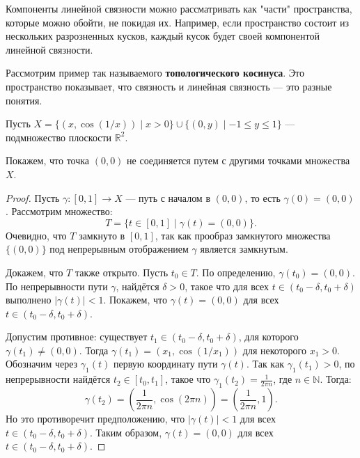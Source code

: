 Компоненты линейной связности можно рассматривать как "части" пространства, которые можно обойти, не покидая их. Например, если пространство состоит из нескольких разрозненных кусков, каждый кусок будет своей компонентой линейной связности.



Рассмотрим пример так называемого \textbf{топологического косинуса}. Это пространство показывает, что связность и линейная связность — это разные понятия.

\begin{example}
Пусть $ X = \{ (x, \cos(1/x)) \mid x > 0 \} \cup \{ (0, y) \mid -1 \leq y \leq 1 \} $ — подмножество плоскости $ \mathbb{R}^2 $.

\begin{center}
\end{center}

Покажем, что точка $ (0,0) $ не соединяется путем с другими точками множества $ X $.

\begin{proof}
Пусть $ \gamma : [0,1] \to X $ — путь с началом в $ (0,0) $, то есть $ \gamma(0) = (0,0) $. Рассмотрим множество:
\[
T = \{ t \in [0,1] \mid \gamma(t) = (0,0) \}.
\]
Очевидно, что $ T $ замкнуто в $ [0,1] $, так как прообраз замкнутого множества $ \{(0,0)\} $ под непрерывным отображением $ \gamma $ является замкнутым.

Докажем, что $ T $ также открыто. Пусть $ t_0 \in T $. По определению, $ \gamma(t_0) = (0,0) $. По непрерывности пути $ \gamma $, найдётся $ \delta > 0 $, такое что для всех $ t \in (t_0 - \delta, t_0 + \delta) $ выполнено $ |\gamma(t)| < 1 $. Покажем, что $ \gamma(t) = (0,0) $ для всех $ t \in (t_0 - \delta, t_0 + \delta) $.

Допустим противное: существует $ t_1 \in (t_0 - \delta, t_0 + \delta) $, для которого $ \gamma(t_1) \neq (0,0) $. Тогда $ \gamma(t_1) = (x_1, \cos(1/x_1)) $ для некоторого $ x_1 > 0 $. Обозначим через $ \gamma_1(t) $ первую координату пути $ \gamma(t) $. Так как $ \gamma_1(t_1) > 0 $, по непрерывности найдётся $ t_2 \in [t_0, t_1] $, такое что $ \gamma_1(t_2) = \frac{1}{2\pi n} $, где $ n \in \mathbb{N} $. Тогда:
\[
\gamma(t_2) = \left(\frac{1}{2\pi n}, \cos(2\pi n)\right) = \left(\frac{1}{2\pi n}, 1\right).
\]
Но это противоречит предположению, что $ |\gamma(t)| < 1 $ для всех $ t \in (t_0 - \delta, t_0 + \delta) $. Таким образом, $ \gamma(t) = (0,0) $ для всех $ t \in (t_0 - \delta, t_0 + \delta) $.


\end{proof}
\end{example}
